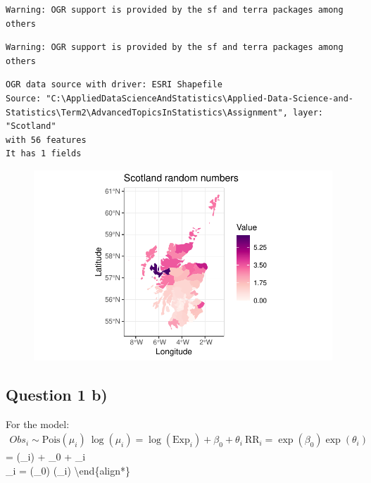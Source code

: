 \documentclass[
  letterpaper,
  DIV=11,
  numbers=noendperiod]{scrartcl}
\begin{document}
\begin{verbatim}
Warning: OGR support is provided by the sf and terra packages among others
\end{verbatim}

\begin{verbatim}
Warning: OGR support is provided by the sf and terra packages among others
\end{verbatim}

\begin{verbatim}
OGR data source with driver: ESRI Shapefile 
Source: "C:\AppliedDataScienceAndStatistics\Applied-Data-Science-and-Statistics\Term2\AdvancedTopicsInStatistics\Assignment", layer: "Scotland"
with 56 features
It has 1 fields
\end{verbatim}

\begin{figure}[H]

{\centering \includegraphics{AssignmentAdvancedTopicsInStatistics_files/figure-pdf/unnamed-chunk-5-1.pdf}

}

\end{figure}

\hypertarget{question-1-b}{%
\subsection{Question 1 b)}\label{question-1-b}}

For the model: \begin{align*}
Obs_i \sim \text{Pois}(\mu_i) \
\log(\mu_i) = \log(_i) + \beta_0 + \theta_i \
_i = \exp(\beta_0) \exp(\theta_i)
\end{align*}= \log(\text{Exp}\_i) + \beta\_0 + \theta\_i\\
\text{RR}\_i = \exp(\beta\_0) \exp(\theta\_i)
\textbackslash end\{align*\}
\end{document}
